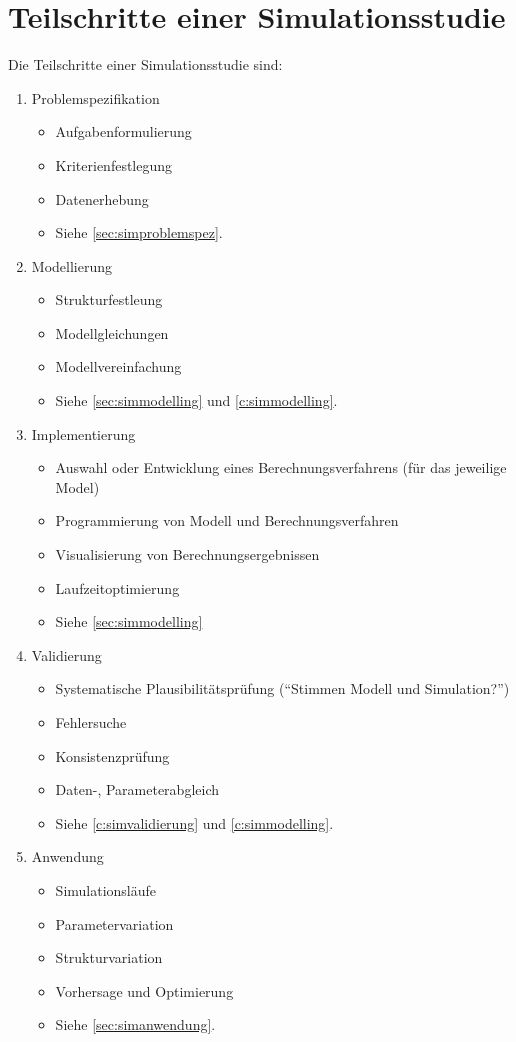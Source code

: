 \chapter{Teilschritte einer Simulationsstudie} %
    Die Teilschritte einer Simulationsstudie sind:
    \begin{enumerate}
    	\item Problemspezifikation
        	\begin{itemize}
        		\item Aufgabenformulierung
        		\item Kriterienfestlegung
        		\item Datenerhebung
        		\item Siehe \ref{sec:simproblemspez}.
        	\end{itemize}
    	\item Modellierung
        	\begin{itemize}
        		\item Strukturfestleung
        		\item Modellgleichungen
        		\item Modellvereinfachung
        		\item Siehe \ref{sec:simmodelling} und \ref{c:simmodelling}.
        	\end{itemize}
    	\item Implementierung
        	\begin{itemize}
        		\item Auswahl oder Entwicklung eines Berechnungsverfahrens (für das jeweilige Model)
        		\item Programmierung von Modell und Berechnungsverfahren
        		\item Visualisierung von Berechnungsergebnissen
        		\item Laufzeitoptimierung
        		\item Siehe \ref{sec:simmodelling}
        	\end{itemize}
    	\item Validierung
        	\begin{itemize}
        		\item Systematische Plausibilitätsprüfung (\enquote{Stimmen Modell und Simulation?})
        		\item Fehlersuche
        		\item Konsistenzprüfung
        		\item Daten-, Parameterabgleich
        		\item Siehe \ref{c:simvalidierung} und \ref{c:simmodelling}.
        	\end{itemize}
    	\item Anwendung
        	\begin{itemize}
        		\item Simulationsläufe
        		\item Parametervariation
        		\item Strukturvariation
        		\item Vorhersage und Optimierung
        		\item Siehe \ref{sec:simanwendung}.
        	\end{itemize}
    \end{enumerate}
